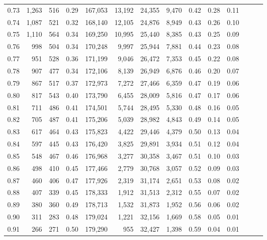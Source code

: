 \begin{tabular}{rrrrrrrrrrrrrr}
0.73 &  1,263 &  516 &  0.29 &  167,053 &   13,192 &  24,355 &   9,470 &  0.42 &  0.28 &      0.11 \\
0.74 &  1,087 &  521 &  0.32 &  168,140 &   12,105 &  24,876 &   8,949 &  0.43 &  0.26 &      0.10 \\
0.75 &  1,110 &  564 &  0.34 &  169,250 &   10,995 &  25,440 &   8,385 &  0.43 &  0.25 &      0.09 \\
0.76 &    998 &  504 &  0.34 &  170,248 &    9,997 &  25,944 &   7,881 &  0.44 &  0.23 &      0.08 \\
0.77 &    951 &  528 &  0.36 &  171,199 &    9,046 &  26,472 &   7,353 &  0.45 &  0.22 &      0.08 \\
0.78 &    907 &  477 &  0.34 &  172,106 &    8,139 &  26,949 &   6,876 &  0.46 &  0.20 &      0.07 \\
0.79 &    867 &  517 &  0.37 &  172,973 &    7,272 &  27,466 &   6,359 &  0.47 &  0.19 &      0.06 \\
0.80 &    817 &  543 &  0.40 &  173,790 &    6,455 &  28,009 &   5,816 &  0.47 &  0.17 &      0.06 \\
0.81 &    711 &  486 &  0.41 &  174,501 &    5,744 &  28,495 &   5,330 &  0.48 &  0.16 &      0.05 \\
0.82 &    705 &  487 &  0.41 &  175,206 &    5,039 &  28,982 &   4,843 &  0.49 &  0.14 &      0.05 \\
0.83 &    617 &  464 &  0.43 &  175,823 &    4,422 &  29,446 &   4,379 &  0.50 &  0.13 &      0.04 \\
0.84 &    597 &  445 &  0.43 &  176,420 &    3,825 &  29,891 &   3,934 &  0.51 &  0.12 &      0.04 \\
0.85 &    548 &  467 &  0.46 &  176,968 &    3,277 &  30,358 &   3,467 &  0.51 &  0.10 &      0.03 \\
0.86 &    498 &  410 &  0.45 &  177,466 &    2,779 &  30,768 &   3,057 &  0.52 &  0.09 &      0.03 \\
0.87 &    460 &  406 &  0.47 &  177,926 &    2,319 &  31,174 &   2,651 &  0.53 &  0.08 &      0.02 \\
0.88 &    407 &  339 &  0.45 &  178,333 &    1,912 &  31,513 &   2,312 &  0.55 &  0.07 &      0.02 \\
0.89 &    380 &  360 &  0.49 &  178,713 &    1,532 &  31,873 &   1,952 &  0.56 &  0.06 &      0.02 \\
0.90 &    311 &  283 &  0.48 &  179,024 &    1,221 &  32,156 &   1,669 &  0.58 &  0.05 &      0.01 \\
0.91 &    266 &  271 &  0.50 &  179,290 &      955 &  32,427 &   1,398 &  0.59 &  0.04 &      0.01 \\

\end{tabular}
